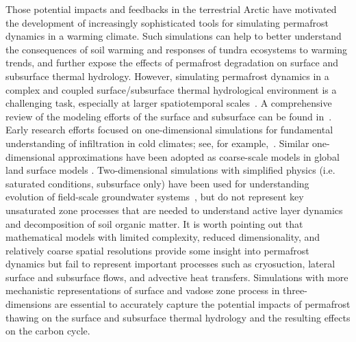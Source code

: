 \documentclass[review]{elsarticle}
\begin{document}
Those potential impacts and feedbacks in the terrestrial Arctic have motivated the development of increasingly sophisticated tools for simulating permafrost dynamics in a warming climate. Such simulations can help to better understand the consequences of soil warming and responses of tundra ecosystems to warming trends, and further expose the effects of permafrost degradation on surface and subsurface thermal hydrology. However, simulating permafrost dynamics in a complex and coupled surface/subsurface thermal hydrological environment is a challenging task, especially at larger spatiotemporal scales~\cite{painter2013modeling}.  A comprehensive review of the modeling efforts of the surface and subsurface can be found in~\cite{kurylyk2014climate}. Early research efforts focused on one-dimensional simulations for fundamental understanding of infiltration in cold climates; see, for example,~\cite{harlan1973analysis, guymon1974coupled, taylor1978model}. Similar one-dimensional approximations have been adopted as coarse-scale models in global land surface models \cite{takata2003development, nicolsky2007improved, lawrence2012simulation, koven2013analysis}.  Two-dimensional simulations with simplified physics (i.e. saturated conditions, subsurface only) have been used for understanding evolution of field-scale groundwater systems~\cite{mckenzie2007groundwater, bense2009evolution}, but do not represent key unsaturated zone processes that are needed to understand active layer dynamics and decomposition of soil organic matter.   It is worth pointing out that mathematical models with limited complexity, reduced dimensionality, and relatively coarse spatial resolutions provide some insight into permafrost dynamics but fail to represent important processes such as cryosuction, lateral surface and subsurface flows, and advective heat transfers. Simulations with more mechanistic representations of surface and vadose zone process in three-dimensions are essential to accurately capture the potential impacts of permafrost thawing on the surface and subsurface thermal hydrology and the resulting effects on the carbon cycle. 
\end{document}

